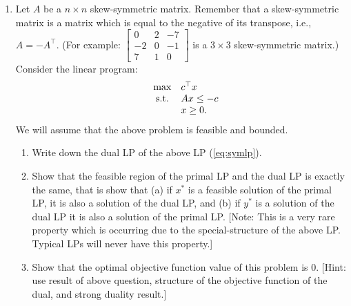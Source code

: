\documentclass[11pt]{article}
\begin{document}
\begin{enumerate}
\item Let $A$ be a $n \times n$ skew-symmetric matrix. Remember that a skew-symmetric matrix is a matrix which is equal to the negative of its transpose, i.e., $A = -A^{\top}$. (For example:  $\left[\begin{array}{ccc} 0 &2 &-7 \\ -2& 0 &-1\\ 7 &1 & 0\end{array}\right]$ is a $3 \times 3$ skew-symmetric matrix.) Consider the linear program:
\begin{eqnarray}\label{eq:symlp}
\begin{array}{rcl}
&\textup{max}& c^{\top}x \\
&\textup{s.t.}& Ax \leq -c \\
&& x \geq 0.
\end{array}
\end{eqnarray}
We will assume that the above problem is feasible and bounded. 
\begin{enumerate}
\item Write down the dual LP of the above LP (\ref{eq:symlp}).
\item Show that the feasible region of the primal LP and the dual LP is exactly the same, that is show that (a) if $x^*$ is a feasible solution of the primal LP, it is also a solution of the dual LP, and (b) if $y^*$ is a solution of the dual LP it is also a solution of the primal LP.  [Note: This is a very rare property which is occurring due to the special-structure of the above LP. Typical LPs will never have this property.]
\item Show that the optimal objective function value of this problem is $0$. [Hint: use result of above question, structure of the objective function of the dual, and strong duality result.]
\end{enumerate}

\end{enumerate}
\end{document}

